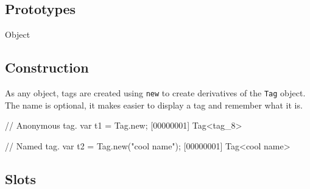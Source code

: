 
\subsection{Prototypes}
\begin{refObjects}
\item[Object]
\end{refObjects}

\subsection{Construction}
\label{stdlib:tag:ctor}

As any object, tags are created using \lstinline{new} to create derivatives
of the \lstinline{Tag} object.  The name is optional, it makes easier to
display a tag and remember what it is.

\begin{urbiscript}[firstnumber=1]
// Anonymous tag.
var t1 = Tag.new;
[00000001] Tag<tag_8>

// Named tag.
var t2 = Tag.new("cool name");
[00000001] Tag<cool name>
\end{urbiscript}

\subsection{Slots}


